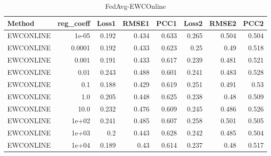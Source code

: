 \begin{table}
\caption{FedAvg-EWCOnline}
\begin{tabular}{lrrrrrrr}
\toprule
Method & reg_coeff & Loss1 & RMSE1 & PCC1 & Loss2 & RMSE2 & PCC2 \\
\midrule
EWCONLINE & 1e-05 & 0.192 & 0.434 & 0.633 & 0.265 & 0.504 & 0.504 \\
EWCONLINE & 0.0001 & 0.192 & 0.433 & 0.623 & 0.25 & 0.49 & 0.518 \\
EWCONLINE & 0.001 & 0.191 & 0.433 & 0.617 & 0.239 & 0.481 & 0.521 \\
EWCONLINE & 0.01 & 0.243 & 0.488 & 0.601 & 0.241 & 0.483 & 0.528 \\
EWCONLINE & 0.1 & 0.188 & 0.429 & 0.619 & 0.251 & 0.491 & 0.53 \\
EWCONLINE & 1.0 & 0.205 & 0.448 & 0.625 & 0.238 & 0.48 & 0.509 \\
EWCONLINE & 10.0 & 0.232 & 0.476 & 0.609 & 0.245 & 0.486 & 0.526 \\
EWCONLINE & 1e+02 & 0.241 & 0.485 & 0.607 & 0.258 & 0.501 & 0.505 \\
EWCONLINE & 1e+03 & 0.2 & 0.443 & 0.628 & 0.242 & 0.485 & 0.504 \\
EWCONLINE & 1e+04 & 0.189 & 0.43 & 0.614 & 0.237 & 0.48 & 0.517 \\
\bottomrule
\end{tabular}
\end{table}
